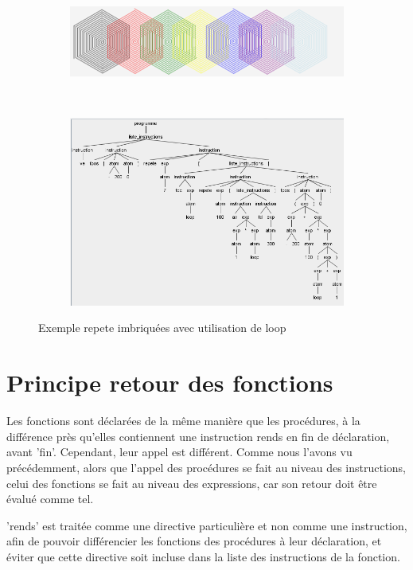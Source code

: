 \documentclass[a4paper,11pt]{article}
\begin{document}
\begin{figure}[!h]
	\centering
	\begin{subfigure}[t]{.5\textwidth}
		\includegraphics[width=\textwidth]{img/loop_figure}
	\end{subfigure}
	~
	\begin{subfigure}[t]{0.7\textwidth}
		\includegraphics[width=\textwidth]{img/loop_tree}
	\end{subfigure}
	\caption{Exemple repete imbriquées avec utilisation de loop}
\end{figure}

\section{Principe retour des fonctions}
Les fonctions sont déclarées de la même manière que les procédures, à la différence près qu'elles contiennent une instruction rends en fin de déclaration, avant 'fin'. Cependant, leur appel est différent. Comme nous l'avons vu précédemment, alors que l'appel des procédures se fait au niveau des instructions, celui des fonctions se fait au niveau des expressions, car son retour doit être évalué comme tel.

'rends' est traitée comme une directive particulière et non comme une instruction, afin de pouvoir différencier les fonctions des procédures à leur déclaration, et éviter que cette directive soit incluse dans la liste des instructions de la fonction.
\end{document}

